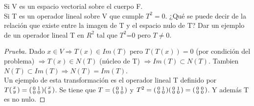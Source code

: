 \documentclass[12pt]{article}
\newenvironment{problem}[2][Problem]{\begin{trivlist}
\item[\hskip \labelsep {\bfseries #1}\hskip \labelsep {\bfseries #2.}]}{\end{trivlist}}
\newenvironment{xmat}
  {\left(\begin{smallmatrix}}
  {\end{smallmatrix}\right)}
\begin{document}
\begin{problem}{2}
\end{problem}
\begin{problem}{2.1}
Si V es un espacio vectorial sobre el cuerpo F. \\
Si T es un operador lineal sobre V que cumple $T^{2}=0$. ¿Qué se puede decir de la relación que existe entre la imagen de T y el espacio nulo de T? Dar un ejemplo de un operador lineal T en $R^{2}$ tal que $T^{2}$=0 pero $T\neq0$.
\end{problem}
 
\begin{proof}[Prueba]
Dado $x \in V \Longrightarrow T(x) \in Im(T)$ pero $T(T(x))= 0$ (por condición del problema) $\Longrightarrow T(x) \in N(T)$ (núcleo de T) $\Longrightarrow Im(T) \subset N(T)$. Tambien $N(T) \subset Im(T) \Longrightarrow N(T) = Im(T)$. \\
Un ejemplo de esta transformación es el operador lineal T definido por $T\begin{xmat}x \\y\end{xmat} = \begin{xmat}0 & 1\\0 & 0\end{xmat}\begin{xmat}x \\y\end{xmat}$. Se tiene que $T=\begin{xmat}0 & 1\\0 & 0\end{xmat}$ y $T^{2}=\begin{xmat}0 & 1\\0 & 0\end{xmat}\begin{xmat}0 & 1\\0 & 0\end{xmat}=\begin{xmat}0 & 0\\0 & 0\end{xmat}$. Y además T es no nulo.
\end{proof}
\end{document}
